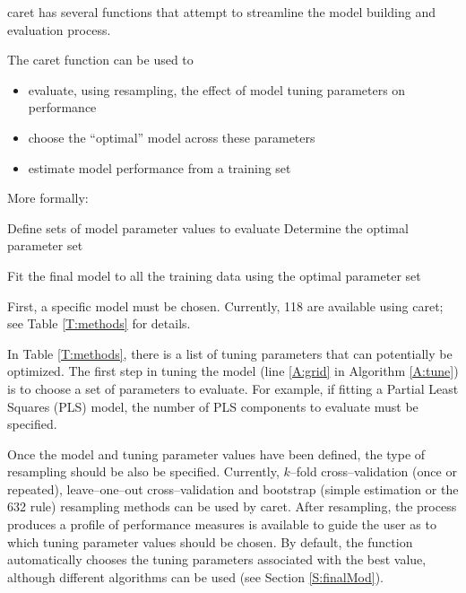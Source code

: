 \documentclass[12pt]{article}
\newcommand{\pkg}[1]{{\fontseries{b}\selectfont #1}}
\renewcommand{\pkg}[1]{{\textsf{#1}}}
\begin{document}
\pkg{caret} has several functions that attempt to streamline the model building and evaluation process. 

The \pkg{caret} function can be used to
\begin{itemize}
   \item evaluate, using resampling, the effect of model tuning parameters on performance
   \item choose the ``optimal'' model across these parameters 
   \item estimate model performance from a training set
\end{itemize}

More formally:

\begin{algorithm}[H]
   \label{A:tune}
   \SetAlgoLined
   \DontPrintSemicolon
  Define  sets of model parameter values to evaluate \;
  Determine the optimal parameter set \;
  
  Fit the final model to all the training data using the optimal
  parameter set\;  
\end{algorithm}


First, a specific model must be chosen. Currently,
118 are available using
\pkg{caret}; see Table \ref{T:methods} for details. 

In Table \ref{T:methods}, there is a list of tuning parameters that can
potentially be optimized.  The first step in tuning the model (line
\ref{A:grid} in Algorithm \ref{A:tune}) is to choose a set of
parameters to evaluate. For example, if fitting a Partial Least Squares
(PLS) model, the number of PLS components to evaluate must be specified. 

Once the model and tuning parameter values have been defined, the type
of resampling should be also be specified. Currently, $k$--fold
cross--validation (once or repeated), 
leave--one--out cross--validation and bootstrap
(simple estimation or the 632 rule) 
resampling methods can be used by \pkg{caret}. After resampling,
the process produces a profile of performance measures is available to
guide the user as to which tuning parameter values should be
chosen. By default, the function automatically chooses the tuning
parameters associated with the best value, although different
algorithms can be used (see Section \ref{S:finalMod}). 
\end{document}
